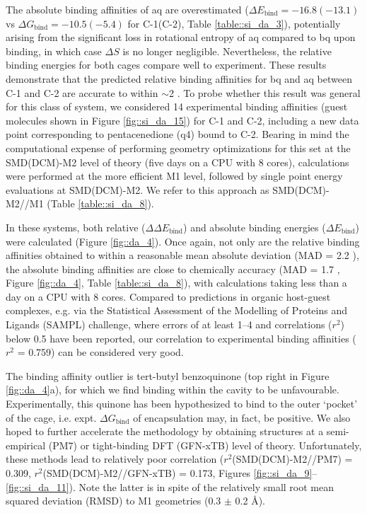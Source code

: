 \documentclass[../../main.tex]{subfiles}
\begin{document}
The absolute binding affinities of aq are overestimated ($\Delta E_\text{bind}= -16.8 (-13.1)$ vs $\Delta G_\text{bind} = -10.5 (-5.4)$ \kcalx for C-1(C-2), Table \ref{table::si_da_3}), potentially arising from the significant loss in rotational entropy of aq compared to bq upon binding, in which case $\Delta S$ is no longer negligible. Nevertheless, the relative binding energies for both cages compare well to experiment. These results demonstrate that the predicted relative binding affinities for bq and aq between C-1 and C-2 are accurate to within $\sim$2 \kcal. To probe whether this result was general for this class of system, we considered 14 experimental binding affinities (guest molecules shown in Figure \ref{fig::si_da_15}) for C-1 and C-2, including a new data point corresponding to pentacenedione (q4) bound to C-2. Bearing in mind the computational expense of performing geometry optimizations for this set at the SMD(DCM)-M2 level of theory (five days on a CPU with 8 cores), calculations were performed at the more efficient M1 level, followed by single point energy evaluations at SMD(DCM)-M2. We refer to this approach as SMD(DCM)-M2//M1 (Table \ref{table::si_da_8}).

In these systems, both relative ($\Delta\Delta E_\text{bind}$) and absolute binding energies ($\Delta E_\text{bind}$) were calculated (Figure \ref{fig::da_4}). Once again, not only are the relative binding affinities obtained to within a reasonable mean absolute deviation (MAD = 2.2 \kcal), the absolute binding affinities are close to chemically accuracy (MAD = 1.7 \kcal, Figure \ref{fig::da_4}, Table \ref{table::si_da_8}), with calculations taking less than a day on a CPU with 8 cores. Compared to predictions in organic host-guest complexes, e.g. via the Statistical Assessment of the Modelling of Proteins and Ligands (SAMPL) challenge, where errors of at least 1–4 \kcalx and correlations ($r^2$) below 0.5 have been reported, our correlation to experimental binding affinities ($r^2$ = 0.759) can be considered very good.\cite{Sure2015, Jensen2015, Rizzi2018}
 
The binding affinity outlier is tert-butyl benzoquinone (top right in Figure \ref{fig::da_4}a), for which we find binding within the cavity to be unfavourable. Experimentally, this quinone has been hypothesized to bind to the outer ‘pocket’ of the cage, i.e. expt. $\Delta G_\text{bind}$ of encapsulation may, in fact, be positive. We also hoped to further accelerate the methodology by obtaining structures at a semi-empirical (PM7\cite{Stewart2012}) or tight-binding DFT (GFN-xTB\cite{Grimme2017xtb}) level of theory. Unfortunately, these methods lead to relatively poor correlation ($r^2$(SMD(DCM)-M2//PM7) = 0.309, $r^2$(SMD(DCM)-M2//GFN-xTB) = 0.173, Figures \ref{fig::si_da_9}--\ref{fig::si_da_11}). Note the latter is in spite of the relatively small root mean squared deviation (RMSD) to M1 geometries (0.3 $\pm$ 0.2 \AA). 
\end{document}
